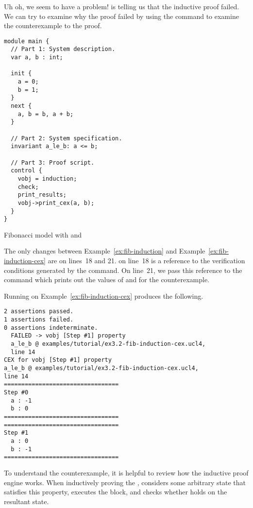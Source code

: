 Uh oh, we seem to have a problem! \uclid{} is telling us that the inductive proof failed. We can try to examine why the proof failed by using the  command to examine the counterexample to the proof.


\begin{uclidlisting}[htbp]
\begin{lstlisting}[language=uclid,style=uclidstyle]
module main {
  // Part 1: System description.
  var a, b : int;

  init {
    a = 0;
    b = 1;
  }
  next {
    a, b = b, a + b;
  }

  // Part 2: System specification.
  invariant a_le_b: a <= b;

  // Part 3: Proof script.
  control {
    vobj = induction;
    check;
    print_results;
    vobj->print_cex(a, b);
  }
}
\end{lstlisting}
\caption{\uclid{} Fibonacci model with  and }
\label{ex:fib-induction-cex}
\end{uclidlisting}

The only changes between Example~\ref{ex:fib-induction} and Example~\ref{ex:fib-induction-cex} are on lines~18 and 21.  on line~18 is a reference to the verification conditions generated by the  command. On line~21, we pass this reference to the  command which prints out the values of  and  for the counterexample.

Running \uclid{} on Example~\ref{ex:fib-induction-cex} produces the following.

\begin{Verbatim}[frame=single, samepage=true]
2 assertions passed.
1 assertions failed.
0 assertions indeterminate.
  FAILED -> vobj [Step #1] property 
  a_le_b @ examples/tutorial/ex3.2-fib-induction-cex.ucl4, 
  line 14
CEX for vobj [Step #1] property 
a_le_b @ examples/tutorial/ex3.2-fib-induction-cex.ucl4, 
line 14
=================================
Step #0
  a : -1
  b : 0
=================================
=================================
Step #1
  a : 0
  b : -1
=================================
\end{Verbatim}

To understand the counterexample, it is helpful to review how the inductive proof engine works. When inductively proving the  , \uclid{} considers some arbitrary state that satisfies this property, executes the  block, and checks whether  holds on the resultant state.

